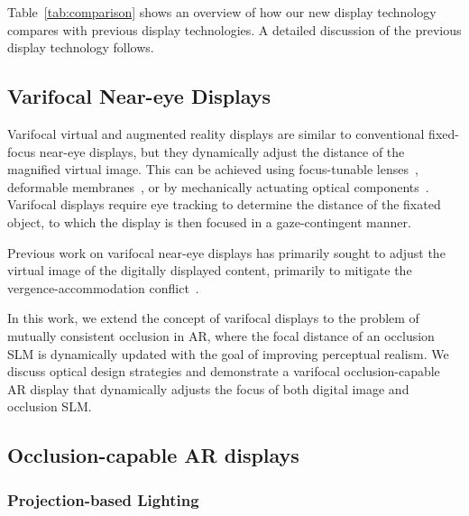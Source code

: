 

Table~\ref{tab:comparison} shows an overview of how our new display technology compares with previous display technologies. A detailed discussion of the previous display technology follows.

\subsection{Varifocal Near-eye Displays}
\label{sec:varifocal_occlusion:related:varifocal}
Varifocal virtual and augmented reality displays are similar to conventional fixed-focus near-eye displays, but they dynamically adjust the distance of the magnified virtual image. This can be achieved using focus-tunable lenses~\cite{Liu2008Optical,Konrad2016Novel,Johnson:16,Padmanaban2016Optimizing,Laffont:2018,Rathinavel2018,xia2019towards}, deformable membranes~\cite{Dunn2017Wide,chakravarthula2018focusar}, or by mechanically actuating optical components~\cite{Shiwa1996proposal,Padmanaban2016Optimizing,Aksit2017Near,rathinavel2018steerable,akcsit2019manufacturing}. Varifocal displays require eye tracking to determine the distance of the fixated object, to which the display is then focused in a gaze-contingent manner. 

Previous work on varifocal near-eye displays has primarily sought to adjust the virtual image of the digitally displayed content, primarily to mitigate the vergence-accommodation conflict~\cite{kooi2004visual,lambooij2009visual}. %

In this work, we extend the concept of varifocal displays to the problem of mutually consistent occlusion in AR, where the focal distance of an occlusion SLM is dynamically updated with the goal of improving perceptual realism. 
We discuss optical design strategies and demonstrate a varifocal occlusion-capable AR display that dynamically adjusts the focus of both digital image and occlusion SLM.

\subsection{Occlusion-capable AR displays}

\subsubsection{Projection-based Lighting}

